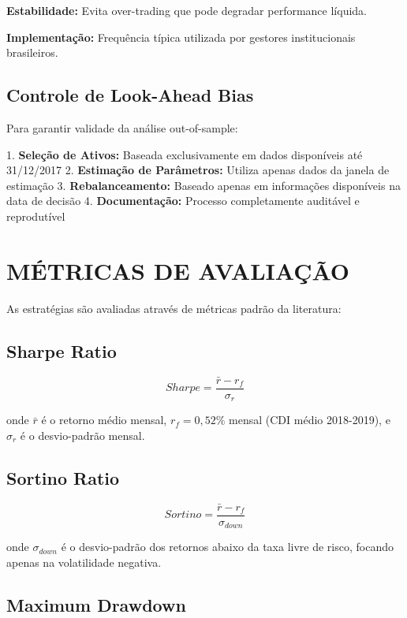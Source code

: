 \textbf{Estabilidade:} Evita over-trading que pode degradar performance líquida.

\textbf{Implementação:} Frequência típica utilizada por gestores institucionais brasileiros.

\subsection{Controle de Look-Ahead Bias}

Para garantir validade da análise out-of-sample:

1. \textbf{Seleção de Ativos:} Baseada exclusivamente em dados disponíveis até 31/12/2017
2. \textbf{Estimação de Parâmetros:} Utiliza apenas dados da janela de estimação
3. \textbf{Rebalanceamento:} Baseado apenas em informações disponíveis na data de decisão
4. \textbf{Documentação:} Processo completamente auditável e reprodutível

\section{MÉTRICAS DE AVALIAÇÃO}

As estratégias são avaliadas através de métricas padrão da literatura:

\subsection{Sharpe Ratio}

\begin{equation}
Sharpe = \frac{\bar{r} - r_f}{\sigma_r}
\end{equation}

onde $\bar{r}$ é o retorno médio mensal, $r_f = 0,52\%$ mensal (CDI médio 2018-2019), e $\sigma_r$ é o desvio-padrão mensal.

\subsection{Sortino Ratio}

\begin{equation}
Sortino = \frac{\bar{r} - r_f}{\sigma_{down}}
\end{equation}

onde $\sigma_{down}$ é o desvio-padrão dos retornos abaixo da taxa livre de risco, focando apenas na volatilidade negativa.

\subsection{Maximum Drawdown}

